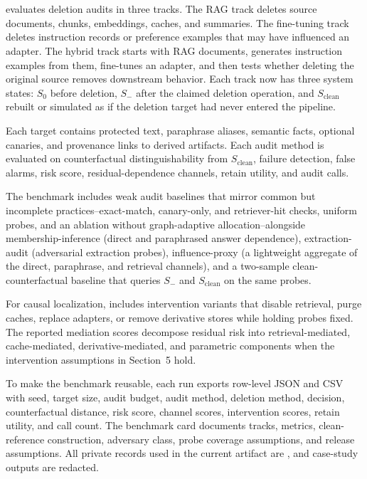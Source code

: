 \section{\bench{}}

\bench{} evaluates deletion audits in three tracks. The RAG track deletes source documents, chunks, embeddings, caches, and summaries. The fine-tuning track deletes instruction records or preference examples that may have influenced an adapter. The hybrid track starts with RAG documents, generates instruction examples from them, fine-tunes an adapter, and then tests whether deleting the original source removes downstream behavior. Each track now has three system states: $S_0$ before deletion, $S_-$ after the claimed deletion operation, and $S_{\mathrm{clean}}$ rebuilt or simulated as if the deletion target had never entered the pipeline.

Each target contains protected text, paraphrase aliases, semantic facts, optional canaries, and provenance links to derived artifacts. Each audit method is evaluated on counterfactual distinguishability from $S_{\mathrm{clean}}$, failure detection, false alarms, risk score, residual-dependence channels, retain utility, and audit calls.

The benchmark includes weak audit baselines that mirror common but incomplete practices--exact-match, canary-only, and retriever-hit checks, uniform probes, and an \method{} ablation without graph-adaptive allocation--alongside membership-inference (direct and paraphrased answer dependence), extraction-audit (adversarial extraction probes), influence-proxy (a lightweight aggregate of the direct, paraphrase, and retrieval channels), and a two-sample clean-counterfactual baseline that queries $S_-$ and $S_{\mathrm{clean}}$ on the same probes.

For causal localization, \bench{} includes intervention variants that disable retrieval, purge caches, replace adapters, or remove derivative stores while holding probes fixed. The reported mediation scores decompose residual risk into retrieval-mediated, cache-mediated, derivative-mediated, and parametric components when the intervention assumptions in Section~5 hold.

To make the benchmark reusable, each run exports row-level JSON and CSV with seed, target size, audit budget, audit method, deletion method, decision, counterfactual distance, risk score, channel scores, intervention scores, retain utility, and call count. The benchmark card documents tracks, metrics, clean-reference construction, adversary class, probe coverage assumptions, and release assumptions. All private records used in the current artifact are , and case-study outputs are redacted.
